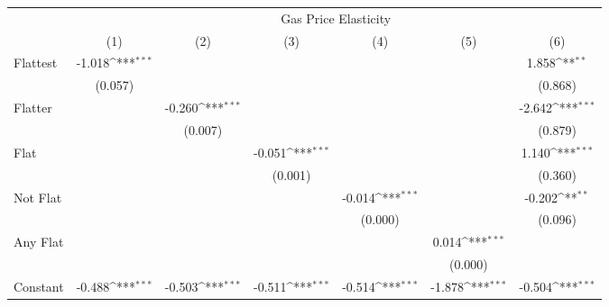 {
\def\sym#1{\ifmmode^{#1}\else\(^{#1}\)\fi}
\begin{tabular}{l*{6}{c}}
\hline\hline
            &\multicolumn{6}{c}{Gas Price Elasticity}                                                                                           \\
            &\multicolumn{1}{c}{(1)}         &\multicolumn{1}{c}{(2)}         &\multicolumn{1}{c}{(3)}         &\multicolumn{1}{c}{(4)}         &\multicolumn{1}{c}{(5)}         &\multicolumn{1}{c}{(6)}         \\
\hline
Flattest    &      -1.018\sym{***}&                     &                     &                     &                     &       1.858\sym{**} \\
            &     (0.057)         &                     &                     &                     &                     &     (0.868)         \\
[1em]
Flatter     &                     &      -0.260\sym{***}&                     &                     &                     &      -2.642\sym{***}\\
            &                     &     (0.007)         &                     &                     &                     &     (0.879)         \\
[1em]
Flat        &                     &                     &      -0.051\sym{***}&                     &                     &       1.140\sym{***}\\
            &                     &                     &     (0.001)         &                     &                     &     (0.360)         \\
[1em]
Not Flat    &                     &                     &                     &      -0.014\sym{***}&                     &      -0.202\sym{**} \\
            &                     &                     &                     &     (0.000)         &                     &     (0.096)         \\
[1em]
Any Flat    &                     &                     &                     &                     &       0.014\sym{***}&                     \\
            &                     &                     &                     &                     &     (0.000)         &                     \\
[1em]
Constant    &      -0.488\sym{***}&      -0.503\sym{***}&      -0.511\sym{***}&      -0.514\sym{***}&      -1.878\sym{***}&      -0.504\sym{***}\\

\end{tabular}}
